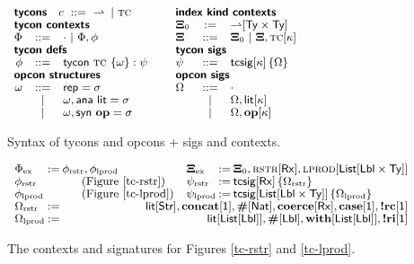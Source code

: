 \documentclass[9pt,preprint]{sigplanconf}
\begin{document}
\begin{figure}[t]
\small
\hspace{-5px}$\begin{array}{rcllcl}
\multicolumn{3}{l}{\mvlbl{tycons}~~~c~::=~{\rightharpoonup}\,~|~ \tc} & \multicolumn{3}{l}{\mvlbl{index kind contexts}}\\
\multicolumn{3}{l}{\mvlbl{tycon contexts}} & \kXi_0 & := & {\rightharpoonup}[\kty \times \kty]\\
\Phi & ::= & \cdot ~|~ \Phi, \phi & \kXi & ::= & \kXi_0 ~|~ \kXi, \tc[\kappa]\\
\multicolumn{3}{l}{\mvlbl{tycon defs}} & \multicolumn{3}{l}{\mvlbl{tycon sigs}}\\
\phi & ::= & \tcdef{\tc}{\psi}{\opdefs}~~~~& \psi & ::= & \tcsig{\kappa}{\opsigs}\\
\multicolumn{3}{l}{\mvlbl{opcon structures}} & \multicolumn{3}{l}{\mvlbl{opcon sigs}}\\
\opdefs & ::= & \keyw{rep} = \st  & \Omega & ::= & \cdot\\
 & ~|~ & \omega, \analitop{\st} & & ~|~ & \Omega, \litsig{\kappa}\\
 & ~|~ & \opdefs, \synop{\opname{op}}{\st} & & ~|~ & \opsigs, \opsig{\opname{op}}{\kappa}
\end{array}$
\caption{Syntax of tycons and opcons + sigs and contexts.}
\label{syntax-TC}
\end{figure}
%
\begin{figure}
\small
\hspace{-5px}$\begin{array}{l@{\hspace{2px}}c@{\hspace{2px}}l@{\hspace{10px}}l@{\hspace{2px}}c@{\hspace{2px}}l}
\Phi_\text{ex} & := & \phi_\text{rstr}, \phi_\text{lprod} & \kXi_\text{ex} & := &\kXi_0, \tcvar{rstr}[\krx], \tcvar{lprod}[\klist{\klbl\times\kty}]\\
\phi_\text{rstr} & & \text{\normalsize(Figure \ref{tc-rstr})} & \psi_\text{rstr} & := &\tcsig{\krx}{\Omega_\text{rstr}}\\
\phi_\text{lprod}& &\text{\normalsize(Figure \ref{tc-lprod})} & \psi_\text{lprod} &:=& \tcsig{\klist{\klbl \times \kty}}{\Omega_\text{lprod}}\\
\Omega_\text{rstr} & := & \multicolumn{4}{r}{\litsig{\kstr}, \opsig{\opname{concat}}{\kunit}, \opsig{\opname{\#}}{\keyw{Nat}}, \opsig{\opname{coerce}}{\krx}, \opsig{\opname{case}}{\kunit}, \opsig{\opname{!rc}}{\kunit}}\\
\Omega_\text{lprod} & := & \multicolumn{4}{r}{\litsig{\klist{\klbl}}, \opsig{\opname{\#}}{\klbl}, \opsig{\opname{with}}{\klist{\klbl}}, \opsig{\opname{!ri}}{\kunit}}
\end{array}$
\caption{The contexts and signatures for Figures \ref{tc-rstr} and \ref{tc-lprod}.}
\label{example-tcsigs}
\end{figure}
\end{document}

